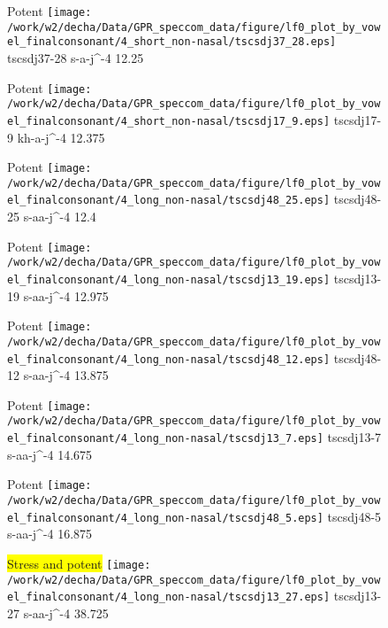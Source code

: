 \documentclass{article}
\begin{document}
\begin{figure}[t]
\begin{minipage}[b]{.24\textwidth}
\colorbox{Apricot}{Potent}
\centering
\texttt{[image: /work/w2/decha/Data/GPR\_speccom\_data/figure/lf0\_plot\_by\_vowel\_finalconsonant/4\_short\_non-nasal/tscsdj37\_28.eps]}
tscsdj37-28 s-a-j\textasciicircum-4 12.25
\end{minipage}
\begin{minipage}[b]{.24\textwidth}
\colorbox{Apricot}{Potent}
\centering
\texttt{[image: /work/w2/decha/Data/GPR\_speccom\_data/figure/lf0\_plot\_by\_vowel\_finalconsonant/4\_short\_non-nasal/tscsdj17\_9.eps]}
tscsdj17-9 kh-a-j\textasciicircum-4 12.375
\end{minipage}
\begin{minipage}[b]{.24\textwidth}
\colorbox{Apricot}{Potent}
\centering
\texttt{[image: /work/w2/decha/Data/GPR\_speccom\_data/figure/lf0\_plot\_by\_vowel\_finalconsonant/4\_long\_non-nasal/tscsdj48\_25.eps]}
tscsdj48-25 s-aa-j\textasciicircum-4 12.4
\end{minipage}
\begin{minipage}[b]{.24\textwidth}
\colorbox{Apricot}{Potent}
\centering
\texttt{[image: /work/w2/decha/Data/GPR\_speccom\_data/figure/lf0\_plot\_by\_vowel\_finalconsonant/4\_long\_non-nasal/tscsdj13\_19.eps]}
tscsdj13-19 s-aa-j\textasciicircum-4 12.975
\end{minipage}
\end{figure}

\begin{figure}[t]
\begin{minipage}[b]{.24\textwidth}
\colorbox{Apricot}{Potent}
\centering
\texttt{[image: /work/w2/decha/Data/GPR\_speccom\_data/figure/lf0\_plot\_by\_vowel\_finalconsonant/4\_long\_non-nasal/tscsdj48\_12.eps]}
tscsdj48-12 s-aa-j\textasciicircum-4 13.875
\end{minipage}
\begin{minipage}[b]{.24\textwidth}
\colorbox{Apricot}{Potent}
\centering
\texttt{[image: /work/w2/decha/Data/GPR\_speccom\_data/figure/lf0\_plot\_by\_vowel\_finalconsonant/4\_long\_non-nasal/tscsdj13\_7.eps]}
tscsdj13-7 s-aa-j\textasciicircum-4 14.675
\end{minipage}
\begin{minipage}[b]{.24\textwidth}
\colorbox{Apricot}{Potent}
\centering
\texttt{[image: /work/w2/decha/Data/GPR\_speccom\_data/figure/lf0\_plot\_by\_vowel\_finalconsonant/4\_long\_non-nasal/tscsdj48\_5.eps]}
tscsdj48-5 s-aa-j\textasciicircum-4 16.875
\end{minipage}
\begin{minipage}[b]{.24\textwidth}
\colorbox{yellow}{Stress and potent}
\centering
\texttt{[image: /work/w2/decha/Data/GPR\_speccom\_data/figure/lf0\_plot\_by\_vowel\_finalconsonant/4\_long\_non-nasal/tscsdj13\_27.eps]}
tscsdj13-27 s-aa-j\textasciicircum-4 38.725
\end{minipage}
\end{figure}
\end{document}
